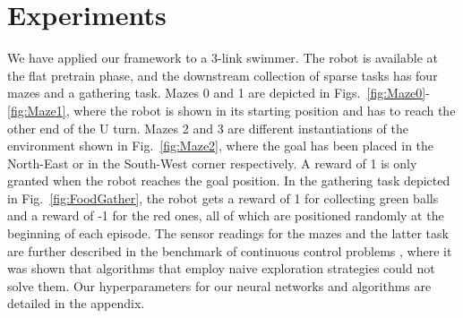 \documentclass{article} %
\begin{document}


\section{Experiments}

We have applied our framework to a 3-link swimmer. The robot is available at the flat pretrain phase, and the downstream collection of sparse tasks has four mazes and a gathering task. Mazes 0 and 1 are depicted in Figs.\ \ref{fig:Maze0}-\ref{fig:Maze1}, where the robot is shown in its starting position and has to reach the other end of the U turn. Mazes 2 and 3 are different instantiations of the environment shown in Fig.\ \ref{fig:Maze2}, where the goal has been placed in the North-East or in the South-West corner respectively. A reward of 1 is only granted when the robot reaches the goal position. In the gathering task depicted in Fig.\ \ref{fig:FoodGather}, the robot gets a reward of 1 for collecting green balls and a reward of -1 for the red ones, all of which are positioned randomly at the beginning of each episode. The sensor readings for the mazes and the latter task are further described in the benchmark of continuous control problems \citep{duan2016benchmarking}, where it was shown that algorithms that employ naive exploration strategies could not solve them. Our hyperparameters for our neural networks and algorithms are detailed in the appendix.
\end{document}

